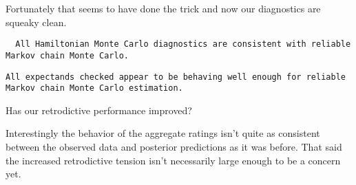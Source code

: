 \documentclass[
  letterpaper,
  DIV=11,
  numbers=noendperiod]{scrartcl}
\newenvironment{Shaded}{\begin{snugshade}}{\end{snugshade}}
\newcommand{\AttributeTok}[1]{\textcolor[rgb]{0.40,0.45,0.13}{#1}}
\newcommand{\ConstantTok}[1]{\textcolor[rgb]{0.56,0.35,0.01}{#1}}
\newcommand{\FunctionTok}[1]{\textcolor[rgb]{0.28,0.35,0.67}{#1}}
\newcommand{\NormalTok}[1]{\textcolor[rgb]{0.00,0.23,0.31}{#1}}
\newcommand{\OtherTok}[1]{\textcolor[rgb]{0.00,0.23,0.31}{#1}}
\newcommand{\SpecialCharTok}[1]{\textcolor[rgb]{0.37,0.37,0.37}{#1}}
\newcommand{\StringTok}[1]{\textcolor[rgb]{0.13,0.47,0.30}{#1}}
\begin{document}
Fortunately that seems to have done the trick and now our diagnostics
are squeaky clean.

\begin{Shaded}
\end{Shaded}

\begin{verbatim}
  All Hamiltonian Monte Carlo diagnostics are consistent with reliable
Markov chain Monte Carlo.
\end{verbatim}

\begin{Shaded}
\end{Shaded}

\begin{verbatim}
All expectands checked appear to be behaving well enough for reliable
Markov chain Monte Carlo estimation.
\end{verbatim}

Has our retrodictive performance improved?

Interestingly the behavior of the aggregate ratings isn't quite as
consistent between the observed data and posterior predictions as it was
before. That said the increased retrodictive tension isn't necessarily
large enough to be a concern yet.
\end{document}
